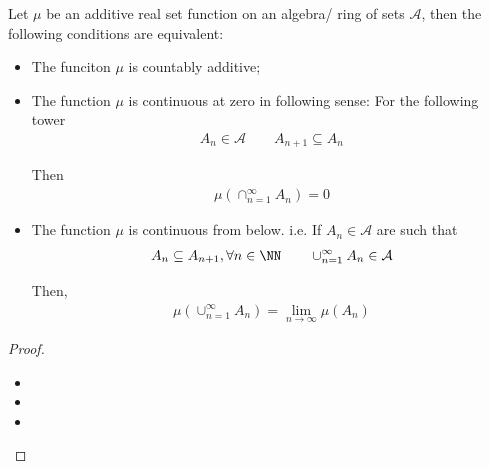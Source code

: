 \documentclass[Total.tex]{subfiles}
\begin{document}
			\begin{proposition}
				Let $\mu$ be an additive real set function on an algebra/ ring of sets $\mathcal{A}$, then the following conditions are equivalent:
				\begin{itemize}
					\item The funciton $\mu$ is countably additive;
					\item The function $\mu$ is continuous at zero in following sense: For the following tower
					\begin{gather*}
						A_n\in \mathcal{A}\qquad A_{n+1}\subseteq A_n
					\end{gather*}
					
					Then
					\begin{gather*}
						\mu(\cap_{n=1}^\infty A_n)=0
					\end{gather*}
					
					\item The function $\mu$ is continuous from below. i.e. If $A_n\in \mathcal{A}$ are such that
					\begin{gather*}
						A_n\subseteq A_{n+1},\forall n\in \NN\qquad \cup_{n=1}^\infty A_n\in\mathcal{A}
					\end{gather*}
					
					Then, 
					\begin{gather*}
						\mu(\cup_{n=1}^\infty A_n)=\lim_{n\rightarrow \infty} \mu(A_n)
					\end{gather*}
				\end{itemize}
			\end{proposition}
			\begin{proof}
				\begin{itemize}
					\item 
					\item 
					\item 
				\end{itemize}
			\end{proof}
			
\end{document}
